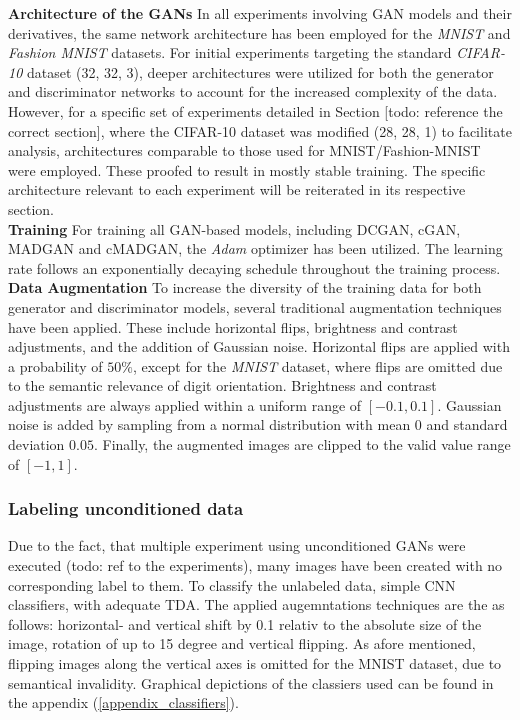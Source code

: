 \noindent\textbf{Architecture of the GANs}
In all experiments involving GAN models and their derivatives, the same network architecture has been employed for the \textit{MNIST} and \textit{Fashion MNIST} datasets. For initial experiments targeting the standard \textit{CIFAR-10} dataset (32, 32, 3), deeper architectures were utilized for both the generator and discriminator networks to account for the increased complexity of the data. However, for a specific set of experiments detailed in Section [todo: reference the correct section], where the CIFAR-10 dataset was modified (28, 28, 1) to facilitate analysis, architectures comparable to those used for MNIST/Fashion-MNIST were employed. These proofed to result in mostly stable training. The specific architecture relevant to each experiment will be reiterated in its respective section.\\

\noindent\textbf{Training}
For training all GAN-based models, including DCGAN, cGAN, MADGAN and cMADGAN, the \textit{Adam} optimizer has been utilized. The learning rate follows an exponentially decaying schedule throughout the training process.\\

\noindent\textbf{Data Augmentation}\label{body_experiment_dataaugmentation}
To increase the diversity of the training data for both generator and discriminator models, several traditional augmentation techniques have been applied. These include horizontal flips, brightness and contrast adjustments, and the addition of Gaussian noise.
Horizontal flips are applied with a probability of \(50\%\), except for the \textit{MNIST} dataset, where flips are omitted due to the semantic relevance of digit orientation. Brightness and contrast adjustments are always applied within a uniform range of \([-0.1, 0.1]\). Gaussian noise is added by sampling from a normal distribution with mean \(0\) and standard deviation \(0.05\). Finally, the augmented images are clipped to the valid value range of \([-1, 1]\).\\

\subsubsection{Labeling unconditioned data}\label{body_experiment_labeling_data}
Due to the fact, that multiple experiment using unconditioned GANs were executed (todo: ref to the experiments), many images have been created with no corresponding label to them. To classify the unlabeled data, simple CNN classifiers, with adequate TDA. The applied augemntations techniques are the as follows: horizontal- and vertical shift by 0.1 relativ to the absolute size of the image, rotation of up to 15 degree and vertical flipping. As afore mentioned, flipping images along the vertical axes is omitted for the MNIST dataset, due to semantical invalidity. Graphical depictions of the classiers used can be found in the appendix (\ref{appendix_classifiers}).\\


